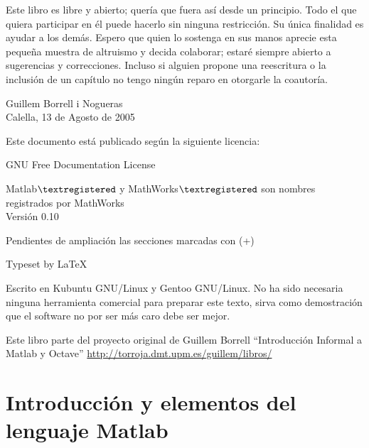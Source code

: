 \documentclass[10pt,fleqn,a4]{book}
\begin{document}
Este libro es libre y abierto; quería que fuera así desde un
principio.  Todo el que quiera participar en él puede hacerlo sin
ninguna restricción.  Su única finalidad es ayudar a los demás. Espero
que quien lo sostenga en sus manos aprecie esta pequeña muestra de
altruismo y decida colaborar; estaré siempre abierto a sugerencias y
correcciones. Incluso si alguien propone una reescritura o la
inclusión de un capítulo no tengo ningún reparo en otorgarle la
coautoría.

\vspace{2cm}

\begin{flushright} 
Guillem Borrell i Nogueras \\
Calella, 13 de Agosto de 2005
\end{flushright}

\pagebreak

Este documento está publicado según la siguiente licencia:
\begin{center}
\begin{Huge}
GNU Free Documentation License
\end{Huge}

\end{center}



Matlab${\textregistered}$ y MathWorks${\textregistered}$ son nombres
registrados por MathWorks\\


Versión 0.10

Pendientes de ampliación las secciones marcadas con (+)

Typeset by \LaTeX{}

Escrito en Kubuntu GNU/Linux y Gentoo GNU/Linux. No ha sido necesaria
ninguna herramienta comercial para preparar este texto, sirva como
demostración que el software no por ser más caro debe ser mejor.

Este libro parte del proyecto original de Guillem Borrell
``Introducción Informal a Matlab y Octave''
\url{http://torroja.dmt.upm.es/guillem/libros/}

\tableofcontents{}

\listoffigures


\part{Introducción y elementos del lenguaje Matlab}
\end{document}
